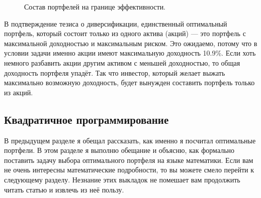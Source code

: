 \begin{figure}[h]
\centering
{}

\caption{Состав портфелей на границе эффективности.}
\label{efficient_frontier_allocation}
\end{figure}

В подтверждение тезиса о диверсификации, единственный оптимальный портфель, 
который состоит только из одного актива (акций) --- это портфель с максимальной 
доходностью и максимальным риском. Это ожидаемо, потому что в условии задачи 
именно акции имеют максимальную доходность 10.9\%. Если хоть немного разбавить 
акции другим активом с меньшей доходностью, то общая доходность портфеля упадёт. 
Так что инвестор, который желает выжать максимально возможную доходность, будет 
вынужден составить портфель только из акций.

\subsection{Квадратичное программирование}

В предыдущем разделе я обещал рассказать, как именно я посчитал оптимальные 
портфели. В этом разделе я выполню обещание и объясню, как формально поставить 
задачу выбора оптимального портфеля на языке математики. Если вам не очень 
интересны математические подробности, то вы можете смело перейти к следующему 
разделу. Незнание этих выкладок не помешает вам продолжить читать статью и 
извлечь из неё пользу.

